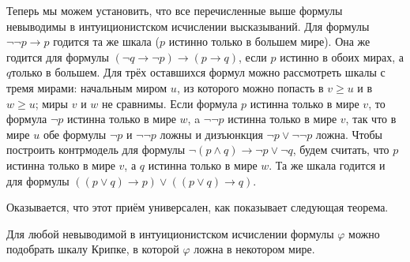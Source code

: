 Теперь мы можем установить, что все перечисленные выше формулы
невыводимы в интуиционистском исчислении высказываний. Для
формулы $\lnot\lnot p \to p$ годится та же шкала ($p$
истинно только в большем мире). Она же годится для формулы
$(\lnot q\to\lnot p)\to (p\to q)$, если $p$ истинно в обоих
мирах, а $q$\т только в большем. Для трёх оставшихся формул
можно рассмотреть шкалы с тремя мирами: начальным миром $u$, из
которого можно попасть в $v\ge u$ и в $w\ge u$; миры $v$ и $w$ не
сравнимы. Если формула $p$ истинна только в мире $v$, то формула
$\lnot p$ истинна только в мире $w$, a $\lnot\lnot p$ истинна
только в мире $v$, так что в мире $u$ обе формулы $\lnot p$ и
$\lnot\lnot p$ ложны и дизъюнкция $\lnot p \lor \lnot\lnot p$
ложна. Чтобы построить контрмодель для формулы $\lnot(p\land
q)\to \lnot p\lor \lnot q$, будем считать, что $p$ истинна
только в мире $v$, а $q$ истинна только в мире $w$. Та же шкала
годится и для формулы $((p\lor q)\to p)\lor((p\lor q)\to q)$.

Оказывается, что этот приём универсален, как показывает
следующая теорема.

\begin{theorem}
\label{kripke-completeness}%
%
Для любой невыводимой в интуиционистском исчислении формулы
$\varphi$ можно подобрать шкалу Крипке, в которой $\varphi$
ложна в некотором мире.
\end{theorem}

